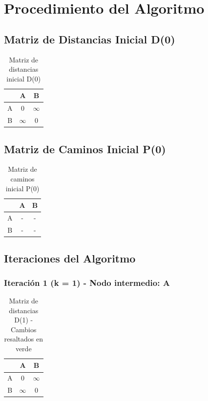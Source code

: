 \documentclass[12pt]{article}
\begin{document}
\clearpage
\section{Procedimiento del Algoritmo}
\subsection{Matriz de Distancias Inicial D(0)}
\begin{table}[h!]
\centering
\begin{tabular}{|c|c|c|}
\hline
 & A & B \\\hline
A & 0 & $\infty$ \\\hline
B & $\infty$ & 0 \\\hline
\end{tabular}
\caption{Matriz de distancias inicial D(0)}
\end{table}

\clearpage
\subsection{Matriz de Caminos Inicial P(0)}
\begin{table}[h!]
\centering
\begin{tabular}{|c|c|c|}
\hline
 & A & B \\\hline
A & - & - \\\hline
B & - & - \\\hline
\end{tabular}
\caption{Matriz de caminos inicial P(0)}
\end{table}

\subsection{Iteraciones del Algoritmo}
\clearpage
\subsubsection{Iteración 1 (k = 1) - Nodo intermedio: A}
\begin{table}[h!]
\centering
\begin{tabular}{|c|c|c|}
\hline
 & A & B \\\hline
A & 0 & $\infty$ \\\hline
B & $\infty$ & 0 \\\hline
\end{tabular}
\caption{Matriz de distancias D(1) - Cambios resaltados en verde}
\end{table}
\end{document}
